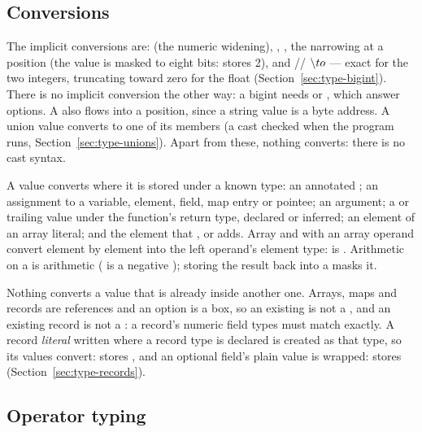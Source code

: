\subsection{Conversions}
\label{sec:conversions}

The implicit conversions are:
 (the numeric widening),
, , the narrowing
 at a  position (the value is masked to
eight bits:  stores 2), and
// $\text{\textbackslash{}} to$  --- exact for the two
integers, truncating toward zero for the float (Section~\ref{sec:type-bigint}).
There is no implicit conversion the other way: a bigint needs  or
, which answer options. A  also
flows into a  position, since a string value is a byte address.
A union value converts to one of its members (a cast checked when the
program runs, Section~\ref{sec:type-unions}). Apart from these, nothing
converts: there is no cast syntax.

A value converts where it is stored under a known type: an annotated
; an assignment to a variable, element, field, map entry or
pointee; an argument; a  or trailing value under the
function's return type, declared or inferred; an element of an array
literal; and the element that
\ic{+=}, \ic{*=} or \ic{::} adds. Array \ic{+} and \ic{+=} with an
array operand convert element by element into the left operand's
element type: \ic{[0.5] + [7, 8]} is \ic{[0.5, 7.0, 8.0]}. Arithmetic
on a  is  arithmetic ( is a negative
); storing the result back into a  masks it.

Nothing converts a value that is already inside another one. Arrays,
maps and records are references and an option is a box, so an existing
\ic{[long]} is not a \ic{[float]}, and an existing record
 is not a : a record's numeric field
types must match exactly. A record \emph{literal} written where a record
type is declared is created as that type, so its values convert:
 stores , and an optional
field's plain value is wrapped: 
stores  (Section~\ref{sec:type-records}).

\subsection{Operator typing}

